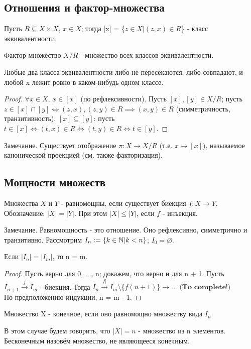 \subsection{Отношения и фактор-множества}
\begin{definition}
	Пусть $R \subseteq X \times X$, $x \in X$; тогда [x] = \{$ z \in X | (z, x) \in R $\} - класс эквивалентности.
\end{definition}
$ \textit{Фактор-множество} $ $ X/R $ - множество всех классов эквивалентности.
\begin{lemma}
	Любые два класса эквивалентности либо не пересекаются, либо совпадают, и любой x лежит ровно в каком-нибудь одном классе.
\end{lemma}
\begin{proof}
	$\forall x \in X $, $x \in [x] $ (по рефлексивности).
	Пусть $ [x], [y] \in X/R $; пусть $ z \in [x] \cap [y] \iff (z, x), (z, y) \in R \implies (x, y) \in R$ (симметричность, транзитивность). 
	$ [x] \subseteq [y] $: пусть $ t \in [x] \iff (t, x) \in R \iff (t, y) \in R \iff t \in [y] $.
\end{proof}
$ \textit{Замечание.} $ Существует отображение $ \pi: X \to X/R $ (т.е. $ x \mapsto [x]) $, называемое $ \textit{канонической проекцией} $ (см. также $ \textit{факторизация} $).

\subsection{Мощности множеств}
\begin{definition}
	Множества $ X $ и $ Y $ - равномощны, если существует биекция $ f: X \to Y $. Обозначение: $ |X| = |Y| $. При этом $ |X| \leq |Y| $, если $ f $ - инъекция.
\end{definition}
$ \textit{Замечание.} $ Равномощность - это отношение. Оно рефлексивно, симметрично и транзитивно.
Рассмотрим $ I_n := \{ k \in \mathbb{N} | k < n \} $; $ I_0 = \varnothing $.
\begin{lemma}
	Если $ |I_n| = |I_m| $, то n = m.
\end{lemma}
\begin{proof}
	Пусть верно для 0, ..., n; докажем, что верно и для n + 1. Пусть $ I_{n+1} \xrightarrow{f} I_m $ - биекция. 
	Тогда $ I_n \xrightarrow{f|} I_m \setminus \{f(n+1)\} \to ...$ $\textbf{(To complete!)} $ \\ 
	По предположению индукции, n = m - 1.
\end{proof}
\begin{definition}
	Множество X - конечное, если оно равномощно множеству вида $ I_n $.
\end{definition}
В этом случае будем говорить, что $ |X| = n $ - множество из n элементов. 
$ \textit{Бесконечным} $ назовём множество, не являющееся конечным.

